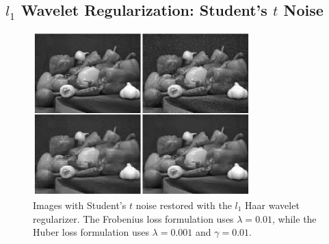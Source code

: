 \documentclass[10pt,a4paper]{article}
\begin{document}
	\subsection{$l_1$ Wavelet Regularization: Student's $t$ Noise}
	\begin{figure}[H]
		\begin{center}
			\includegraphics[width = 0.75\textwidth]{../figures/waveletStudentH.pdf} 
		\end{center}
		\caption{Images with Student's $t$ noise restored with the $l_1$ Haar wavelet regularizer. The Frobenius loss formulation uses $\lambda = 0.01$, while the Huber loss formulation uses $\lambda = 0.001$ and $\gamma = 0.01$.}
		\label{waveletH_student}
	\end{figure}
	\vspace{-1ex}
\end{document}
